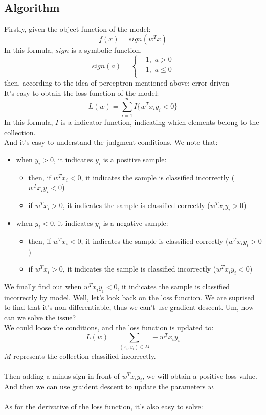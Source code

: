 \documentclass{report}
\begin{document}
\subsection{Algorithm}
Firstly, given the object function of the model:
$$
f(x)=sign(w^Tx)
$$
In this formula, $sign$ is a symbolic function.
$$
sign(a)=
\begin{cases}
+1,\,\,a>0\\
-1,\,\,a\le0\\
\end{cases}
$$
then, according to the idea of perceptron mentioned above: error driven\\
It's easy to obtain the loss function of the model:
$$
L(w)=\sum_{i=1}^n I\{w^Tx_iy_i<0 \}
$$
In this formula, $I$ is a indicator function, indicating which elements belong to the collection.\\
And it's easy to understand the judgment conditions. We note that:
\begin{itemize}
	\item when $y_i>0$, it indicates $y_i$ is a positive sample:
	\begin{itemize}
	\item then, if $w^Tx_i<0$, it indicates the sample is classified incorrectly ($w^Tx_i y_i<0$)
	\item if $w^Tx_i>0$, it indicates the sample is classified correctly ($w^Tx_i y_i>0$)
	\end{itemize} 
	\item when $y_i<0$, it indicates $y_i$ is a negative sample:
	\begin{itemize}
	\item then, if $w^Tx_i<0$, it indicates the sample is classified correctly ($w^Tx_i y_i>0$)
	\item if $w^Tx_i>0$, it indicates the sample is classified incorrectly ($w^Tx_i y_i<0$)
	\end{itemize}
\end{itemize}
We finally find out when $w^Tx_i y_i<0$, it indicates the sample is classified incorrectly by model.
Well, let's look back on the loss function. We are suprised to find that it's non differentiable, thus we can't use gradient descent. Um, how can we solve the issue?\\
We could loose the conditions, and the loss function is updated to:
$$
L(w)=\sum_{(x_i,y_i)\in M} -w^Tx_i y_i
$$
$M$ represents the collection classified incorrectly.\\\\
Then adding a minus sign in front of $w^Tx_i y_i$, we will obtain a positive loss value. And then we can use graident descent to update the parameters $w$.\\\\
As for the derivative of the loss function, it's also easy to solve:
\end{document}
